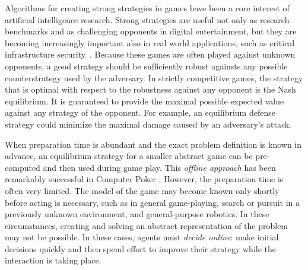 \documentclass{aamas2015}
\newcounter{mlNoteCounter}
\newcommand{\mlnote}[1]{{\scriptsize \color{darkgreen} $\blacksquare$ \refstepcounter{mlNoteCounter}\textsf{[ML]$_{\arabic{mlNoteCounter}}$:{#1}}}}
\renewcommand{\mlnote}[1]{}
\begin{document}
Algorithms for creating strong strategies in games have been a core interest of artificial intelligence research. Strong strategies are useful not only as research benchmarks and as challenging opponents in digital entertainment, but they are becoming increasingly important also in real world applications, such as critical infrastructure security~\cite{Tambe11}.
Because these games are often played against unknown opponents, a good strategy should be sufficiently robust againsts any possible counterstrategy used by the adversary. In strictly competitive games, the strategy that is optimal with respect to the robustness against any opponent is the Nash equilibrium. It is guaranteed to provide the maximal possible expected value against any strategy of the opponent. For example, an equilibrium defense strategy could minimize the maximal damage caused by an adversary's attack.

When preparation time is abundant and the exact problem definition is known in advance, an equilibrium strategy for a smaller abstract game can be pre-computed and 
then used during game play. This {\it offline approach} has been remarkably successful in 
Computer Poker \cite{Johanson07Msc,Gilpin09,Sandholm10The,Rubin11Poker,Johanson13Evaluating}. 
However, the preparation time is often very limited. The model of the game may become known only shortly before acting is necessary, such as in general game-playing, search or pursuit in a previously unknown environment, and general-purpose robotics. In these circumstances, creating and solving an abstract representation of the problem may not be possible. In these cases, agents must {\it decide online}: make initial decisions quickly and then spend effort to improve their strategy while the interaction is taking place.
\end{document}
